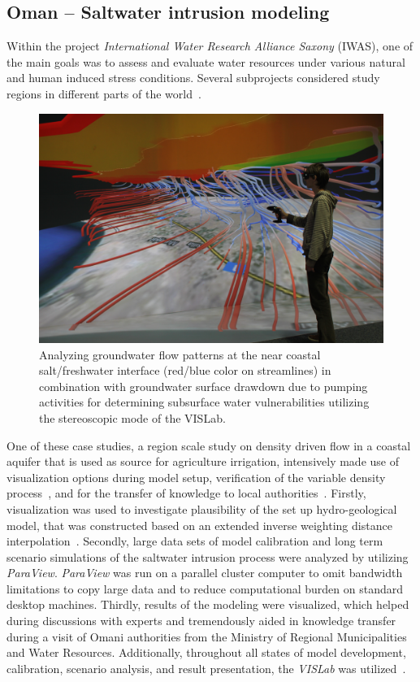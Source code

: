 \documentclass[twocolumn]{svjour3}          %
\begin{document}
\subsection{Oman -- Saltwater intrusion modeling}
\label{oman---saltwater-intrusion}

Within the project \emph{International Water Research Alliance Saxony} (IWAS), one of the main goals was to assess and evaluate water resources under various natural and human induced stress conditions. Several subprojects considered study regions in different parts of the world~\cite{kalbus:ees}.

\begin{figure}[htb]
  \includegraphics[width=\linewidth]{images/oman.jpg}
\caption{Analyzing groundwater flow patterns at the near coastal salt/freshwater interface (red/blue color on streamlines) in combination with groundwater surface drawdown due to pumping activities for determining subsurface water vulnerabilities utilizing the stereoscopic mode of the VISLab.}
\label{fig:oman}
\end{figure}

One of these case studies, a region scale study on density driven flow in a coastal aquifer that is used as source for agriculture irrigation, intensively made use of visualization options during model setup, verification of the variable density process~\cite{Beinhorn200589}, and for the transfer of knowledge to local authorities~\cite{walther:cam, walther:eesenvirvis}. Firstly, visualization was used to investigate plausibility of the set up hydro-geological model, that was constructed based on an extended inverse weighting distance interpolation~\cite{walther:modelcare}. Secondly, large data sets of model calibration and long term scenario simulations of the saltwater intrusion process were analyzed by utilizing \emph{ParaView}. \emph{ParaView} was run on a parallel cluster computer to omit bandwidth limitations to copy large data and to reduce computational burden on standard desktop machines. Thirdly, results of the modeling were visualized, which helped during discussions with experts and tremendously aided in knowledge transfer during a visit of Omani authorities from the Ministry of Regional Municipalities and Water Resources. Additionally, throughout all states of model development, calibration, scenario analysis, and result presentation, the \emph{VISLab} was utilized~\cite{walther:eesenvirvis}.
\end{document}
